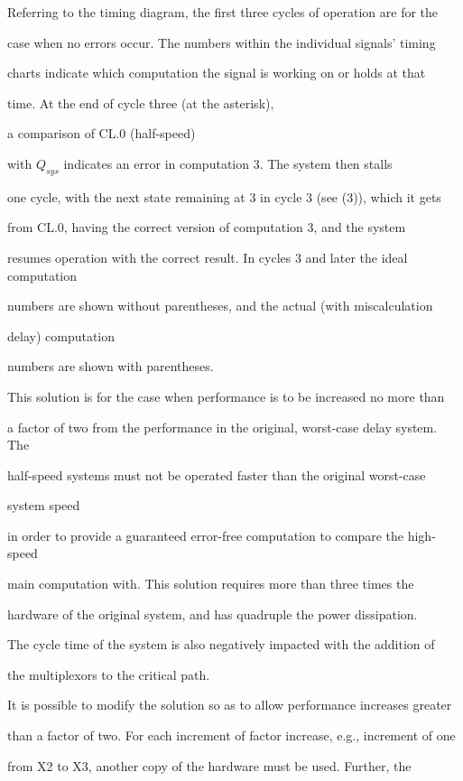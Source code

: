 \documentclass[12pt,dvips]{article}
\begin{document}
Referring to the timing diagram, the first three cycles of operation are for the

case when no errors occur.  The numbers within the individual signals' timing

charts indicate which computation the signal is working on or holds at that

time. At the end of cycle three (at the asterisk),

a comparison of CL.0 (half-speed)

with $Q_{sys}$ indicates an error in computation 3. The system then stalls

one cycle, with the next state remaining at 3 in cycle 3 (see (3)), which it gets

from CL.0, having the correct version of computation 3, and the system

resumes operation with the correct result. In cycles 3 and later the ideal computation

numbers are shown without parentheses, and the actual (with miscalculation

delay) computation

numbers are shown with parentheses.



This solution is for the case when performance is to be increased no more than

a factor of two from the performance in the original, worst-case delay system. The

half-speed systems must not be operated faster than the original worst-case

system speed

in order to provide a guaranteed error-free computation to compare the high-speed

main computation with. This solution requires more than three times the

hardware of the original system, and has quadruple the power dissipation.

The cycle time of the system is also negatively impacted with the addition of

the multiplexors to the critical path.



It is possible to modify the solution so as to allow performance increases greater

than a factor of two. For each increment of factor increase, e.g., increment of one

from X2 to X3, another copy of the hardware must be used. Further, the
\end{document}
